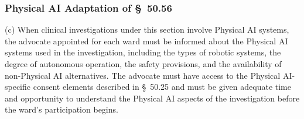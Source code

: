 \subsubsection{Physical AI Adaptation of \S~50.56}

(c) When clinical investigations under this section involve Physical AI systems, the advocate appointed for each ward must be informed about the Physical AI systems used in the investigation, including the types of robotic systems, the degree of autonomous operation, the safety provisions, and the availability of non-Physical AI alternatives. The advocate must have access to the Physical AI-specific consent elements described in \S~50.25 and must be given adequate time and opportunity to understand the Physical AI aspects of the investigation before the ward's participation begins.

